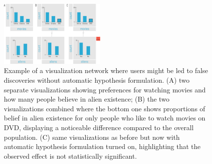 \begin{figure}
\centering
\includegraphics[width=0.47\textwidth]{figures/example}
\caption{Example of a visualization network where users might be led to false discoveries without automatic hypothesis formulation. (A) two separate visualizations showing preferences for watching movies and how many people believe in alien existence; (B) the two visualizations combined where the bottom one shows proportions of belief in alien existence for only people who like to watch movies on DVD, displaying a noticeable difference compared to the overall population. (C) same visualizations as before but now with automatic hypothesis formulation turned on, highlighting that the observed effect is not statistically significant.}
\label{fig:example}
\vspace{-3.5ex}
\end{figure}